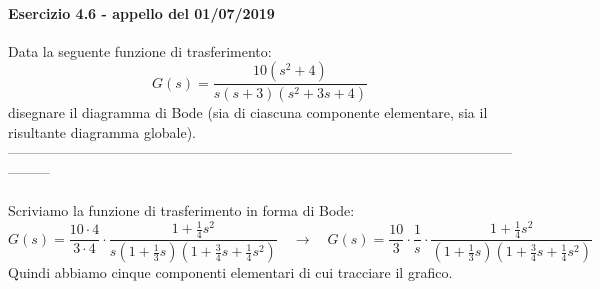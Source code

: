 \documentclass[12pt,a4paper]{article}
\begin{document}
	\paragraph{Esercizio 4.6 - appello del 01/07/2019} Data la seguente funzione di trasferimento:
	\[
		G(s) = \frac{10(s^2+4)}{s(s+3)(s^2+3s+4)}
	\]
	disegnare il diagramma di Bode (sia di ciascuna componente elementare, sia il risultante diagramma globale).\\
	---------------------------------------------------------------------------------------------------------------------\\ \\
	Scriviamo la funzione di trasferimento in forma di Bode:
	\[
		G(s) = \frac{10 \cdot 4}{3 \cdot 4}\cdot\frac{1+\frac{1}{4}s^2}{s\left(1+\frac{1}{3}s\right)\left(1+\frac{3}{4}s+\frac{1}{4}s^2\right)}\quad\rightarrow\quad G(s) = \frac{10}{3}\cdot\frac{1}{s}\cdot\frac{1+\frac{1}{4}s^2}{\left(1+\frac{1}{3}s\right)\left(1+\frac{3}{4}s+\frac{1}{4}s^2\right)}
	\]
	Quindi abbiamo cinque componenti elementari di cui tracciare il grafico.\\
\end{document}
